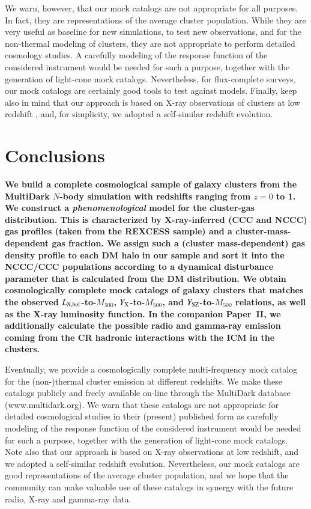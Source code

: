 \documentclass[useAMS,usenatbib]{mn2e}
\begin{document}
{We warn, however, that our mock catalogs are not appropriate for all purposes. In fact, they are 
representations of the average cluster population. While they are very useful as baseline for new 
simulations, to test new observations, and for the non-thermal modeling of clusters, they are not 
appropriate to perform detailed cosmology studies. A carefully modeling of the response function 
of the considered instrument would be needed for such a purpose, together with the generation of 
light-cone mock catalogs. Nevertheless, for flux-complete surveys, our mock catalogs are
certainly good tools to test against models. Finally, keep also in mind that our approach is based on 
X-ray observations of clusters at low redshift \citep{2008A&A...487..431C,2009ApJ...693.1142S}, 
and, for simplicity, we adopted a self-similar redshift evolution.
}


\section{Conclusions}
\label{sec:7}

{\bf We build a complete cosmological sample of galaxy clusters from the MultiDark 
$N$-body simulation with redshifts ranging from $z = 0$ to 1. We construct a 
\emph{phenomenological} model for the cluster-gas distribution. This is characterized 
by X-ray-inferred (CCC and NCCC) gas profiles (taken from the REXCESS sample) 
and a cluster-mass-dependent gas fraction. We assign such a (cluster mass-dependent) 
gas density profile to each DM halo in our sample and sort it into the NCCC/CCC populations 
according to a dynamical disturbance parameter that is calculated from the DM distribution.
We obtain cosmologically complete mock catalogs of galaxy clusters that matches the 
observed $L_{{\mathrm{X, bol}}}$-to-$M_{500}$, $Y_{{\mathrm{X}}}$-to-$M_{500}$, and 
$Y_{{\mathrm{SZ}}}$-to-$M_{500}$ relations, as well as the X-ray luminosity function. 
In the companion Paper~II, we additionally calculate the possible radio and gamma-ray 
emission coming from the CR hadronic interactions with the ICM in the clusters. 

Eventually, we provide a cosmologically complete multi-frequency mock catalog for the (non-)thermal 
cluster emission at different redshifts. We make these catalogs publicly and freely available 
on-line through the MultiDark database (www.multidark.org). We warn that these catalogs
are not appropriate for detailed cosmological studies in their (present) published form as 
carefully modeling of the response function of the considered instrument would be needed 
for such a purpose, together with the generation of light-cone mock catalogs. Note also that 
our approach is based on X-ray observations at low redshift, and we adopted a self-similar redshift 
evolution. Nevertheless, our mock catalogs are good representations of the average cluster population,
and we hope that the  community can make valuable use of these catalogs in synergy with the future radio, 
X-ray and gamma-ray data.}
\end{document}
